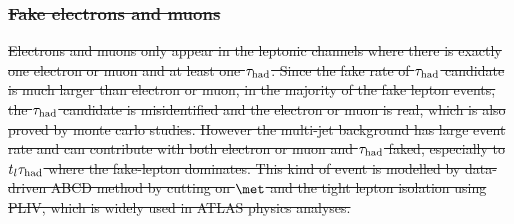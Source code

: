 \documentclass[PAPER, coverpage, atlasdraft=true, texlive=2016, UKenglish]{\ATLASLATEXPATH atlasdoc}
\providecommand{\DIFdel}[1]{{\protect\color{red}\sout{#1}}}                      %
\providecommand{\DIFdelbegin}{} %
\providecommand{\DIFdelend}{} %
\begin{document}
\DIFdelbegin \subsubsection{\DIFdel{Fake electrons and muons}}
\addtocounter{subsubsection}{-1}%
\DIFdel{Electrons and muons only appear in the leptonic channels where there is exactly one electron or muon and at least one $\tau_{\mathrm{had}}$. Since the fake rate of $\tau_{\mathrm{had}}$ candidate is much larger than electron or muon, in the majority of the fake lepton events, the $\tau_{\mathrm{had}}$ candidate is misidentified and the electron or muon is real, which is also proved by monte carlo studies. However the multi-jet background has large event rate and can contribute with both electron or muon and $\tau_{\mathrm{had}}$ faked, especially to $t_l\tau_{\mathrm{had}}$ where the fake-lepton dominates.
This kind of event is modelled by data-driven ABCD method by cutting on $\met$ and the tight lepton isolation using PLIV, which is widely used in ATLAS physics analyses.
}%

\DIFdelend %


\end{document}

